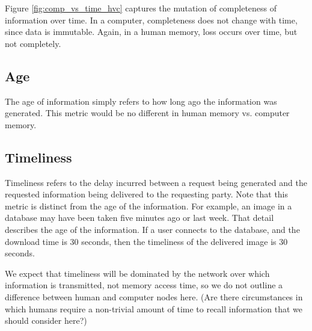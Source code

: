Figure \ref{fig:comp_vs_time_hvc} captures the mutation of completeness of information over time.  In a computer, completeness does not change with time, since data is immutable.  Again, in a human memory, loss occurs over time, but not completely.  

\subsection{Age}
The age of information simply refers to how long ago the information was generated.  This metric would be no different in human memory vs. computer memory.  

\subsection{Timeliness}
Timeliness refers to the delay incurred between a request being generated and the requested information being delivered to the requesting party.  Note that this metric is distinct from the age of the information.  For example, an image in a database may have been taken five minutes ago or last week.  That detail describes the age of the information.  If a user connects to the database, and the download time is $30$ seconds, then the timeliness of the delivered image is $30$ seconds.  

We expect that timeliness will be dominated by the network over which information is transmitted, not memory access time, so we do not outline a difference between human and computer nodes here.  (Are there circumstances in which humans require a non-trivial amount of time to recall information that we should consider here?)
